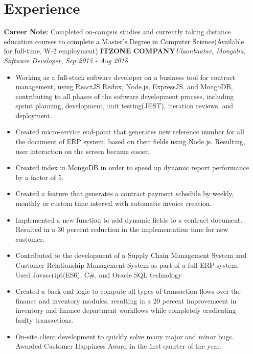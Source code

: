 \documentclass[letterpaper,11pt]{article}
\newcommand{\resumeItemListStart}{\begin{itemize}}
\newcommand{\resumeItemListEnd}{\end{itemize}\vspace{-5pt}}
\begin{document}
\section{Experience}
  \textbf{Career Note}{: Completed on-campus studies and currently taking distance education courses to complete a Master's Degree in Computer Science(Available for full-time, W-2 employment)}
  \vfill
      \textbf{ITZONE COMPANY}\hfill \textit{Ulaanbaatar, Mongolia, Software Developer, Sep 2015 - Aug 2018}
      \resumeItemListStart
        \item{
          Working as a full-stack software developer on a business tool for contract management, using ReactJS
          Redux, Node.js, ExpressJS, and MongoDB, contributing to all phases of the software development
          process, including sprint planning, development, unit testing(JEST), iteration reviews, and deployment.
        }
        \item{
          Created micro-service end-point that generates new reference number for all the document of ERP system, based on their fields using Node.js. Resulting, user interaction on the screen became easier.
        }
        \item{
          Created index in MongoDB in order to speed up dynamic report performance by a factor of 5.
        }
        \item{
          Created a feature that generates a contract payment schedule by weekly, monthly or custom time
          interval with automatic invoice creation.
        }
        \item{
         Implemented a new function to add dynamic fields to a contract document. Resulted in a 30 percent reduction in the implementation time for new customer.
        }
        \item{
          Contributed to the development of a Supply Chain Management System and
          Customer Relationship Management System as part of a full ERP system. Used Javascript(ES6), C\#,
          and Oracle SQL technology
        }
        \item{
          Created a back-end logic to compute all types of transaction flows over the finance and inventory modules,
          resulting in a 20 percent improvemeent in inventory and finance department workflows while completely eradicating faulty transactions.
        }
     
        \item{
           On-site client development to quickly solve many major and minor bugs. Awarded Customer Happiness Award in the first quarter of the year.
        }
      \resumeItemListEnd
  
\end{document}
